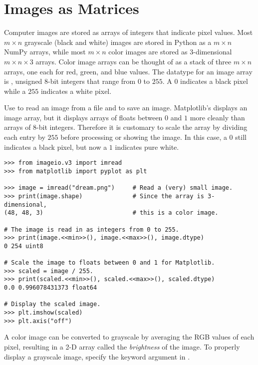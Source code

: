 \section*{Images as Matrices} %

Computer images are stored as arrays of integers that indicate pixel values.
Most $m\times n$ grayscale (black and white) images are stored in Python as a $m\times n$ NumPy arrays, while most $m\times n$ color images are stored as $3$-dimensional $m\times n \times 3$ arrays.
Color image arrays can be thought of as a stack of three $m\times n$ arrays, one each for red, green, and blue values.
The datatype for an image array is , unsigned 8-bit integers that range from $0$ to $255$.
A $0$ indicates a black pixel while a $255$ indicates a white pixel.

Use  to read an image from a file and  to save an image.
Matplotlib's  displays an image array, but it displays arrays of floats between $0$ and $1$ more cleanly than arrays of 8-bit integers.
Therefore it is customary to scale the array by dividing each entry by $255$ before processing or showing the image.
In this case, a $0$ still indicates a black pixel, but now a $1$ indicates pure white.

\begin{lstlisting}
>>> from imageio.v3 import imread
>>> from matplotlib import pyplot as plt

>>> image = imread("dream.png")     # Read a (very) small image.
>>> print(image.shape)              # Since the array is 3-dimensional,
(48, 48, 3)                         # this is a color image.

# The image is read in as integers from 0 to 255.
>>> print(image.<<min>>(), image.<<max>>(), image.dtype)
0 254 uint8

# Scale the image to floats between 0 and 1 for Matplotlib.
>>> scaled = image / 255.
>>> print(scaled.<<min>>(), scaled.<<max>>(), scaled.dtype)
0.0 0.996078431373 float64

# Display the scaled image.
>>> plt.imshow(scaled)
>>> plt.axis("off")
\end{lstlisting}

A color image can be converted to grayscale by averaging the RGB values of each pixel, resulting in a 2-D array called the \emph{brightness} of the image.
To properly display a grayscale image, specify the keyword argument  in .

